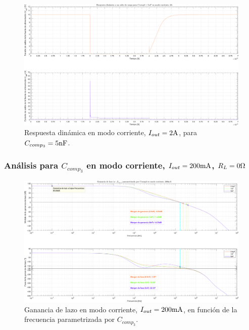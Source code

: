 \clearpage

\begin{figure}[H] %
\begin{center}
\includegraphics[width=1.1 \textwidth, angle=90]{./img/plots/dynamic/power_supply_CCOMP3_5n_STEP_Modo3.png}
\caption{\label{fig:fig_power_supply_CCOMP3_STEP_5n_Modo3}\footnotesize{Respuesta dinámica en modo corriente, $I_{out} = 2 \si[per-mode=symbol]{\ampere}$, para $C_{comp_{3}} = 5 \si[per-mode=symbol]{\nano\farad} $.}}
\end{center}
\end{figure}

\clearpage


\subsubsection{Análisis para $C_{comp_{3}}$ en modo corriente, $I_{out} = 200 \si[per-mode=symbol]{\milli\ampere}$, $R_{L} = 0 \si[per-mode=symbol]{\ohm}$}

\clearpage

\begin{figure}[H] %
\begin{center}
\includegraphics[width=1.1 \textwidth, angle=90]{./img/plots/loop/power_supply_CCOMP3_LOOP_Modo4.png}
\caption{\label{fig:fig_power_supply_CCOMP3_LOOP_Modo4}\footnotesize{Ganancia de lazo en modo corriente, $I_{out} = 200 \si[per-mode=symbol]{\milli\ampere}$, en función de la frecuencia parametrizada por $C_{comp_{3}}$.}}
\end{center}
\end{figure}


